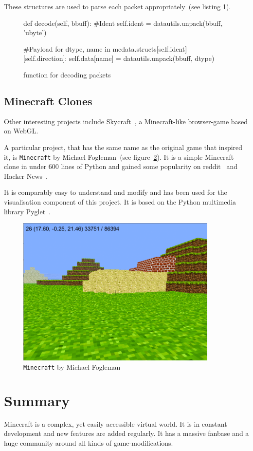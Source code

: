 These structures are used to parse each packet appropriately~(see listing \ref{snippet_parse}).

		\begin{figure}[ht]
			\centering
			\begin{minipage}{13cm}
				\begin{pseudocode}
	def decode(self, bbuff):
		#Ident
		self.ident = datautils.unpack(bbuff, 'ubyte')
		
		#Payload
		for dtype, name in mcdata.structs[self.ident][self.direction]:
			self.data[name] = datautils.unpack(bbuff, dtype)
					\end{pseudocode}
				\caption{function for decoding packets}
				\label{snippet_parse}
			\end{minipage}
		\end{figure}
		
		\subsection{Minecraft Clones}
Other interesting projects include Skycraft~\cite{skycraft}, a Minecraft-like browser-game based on WebGL.

A particular project, that has the same name as the original game that inspired it, is \texttt{Minecraft} by Michael Fogleman~(see figure~\ref{fogleman_mc_screen}). It is a simple Minecraft clone in under 600 lines of Python and gained some popularity on reddit~\cite{fogle-reddit} and Hacker News~\cite{fogle_hn}.

It is comparably easy to understand and modify and has been used for the visualisation component of this project. It is based on the Python multimedia library Pyglet~\cite{pyglet}.

\begin{figure}[h]
  \centering
    \includegraphics[width=10cm]{graphics/fogleman_mc_screen}
  \caption{\texttt{Minecraft} by Michael Fogleman}
  \label{fogleman_mc_screen}
\end{figure}

    \section{Summary}
Minecraft is a complex, yet easily accessible virtual world. It is in constant development and new features are added regularly. It has a massive fanbase and a huge community around all kinds of game-modifications.